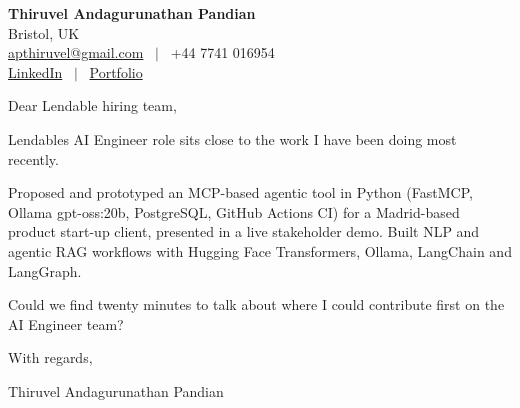 \documentclass[11pt,a4paper]{article}
\begin{document}
\raggedright
\pagestyle{empty}

\begin{center}
    {\LARGE \color{linkblue} \textbf{Thiruvel Andagurunathan Pandian}}\\[0.2cm]
    Bristol, UK \\
    \href{mailto:apthiruvel@gmail.com}{apthiruvel@gmail.com} \ $|$ \ +44 7741 016954 \\
\href{https://www.linkedin.com/in/thiruvel-a-p/}{LinkedIn} \ $|$ \ \href{https://thiruvel-ap.github.io/PersonalPortfolio/}{Portfolio}
\end{center}

\vspace{0.4cm}

\noindent
Dear Lendable hiring team,

Lendable\textquotesingle{}s AI Engineer role sits close to the work I have been doing most recently.

Proposed and prototyped an MCP-based agentic tool in Python (FastMCP, Ollama gpt-oss:20b, PostgreSQL, GitHub Actions CI) for a Madrid-based product start-up client, presented in a live stakeholder demo. Built NLP and agentic RAG workflows with Hugging Face Transformers, Ollama, LangChain and LangGraph.

Could we find twenty minutes to talk about where I could contribute first on the AI Engineer team?

\vspace{0.5cm}

With regards,

Thiruvel Andagurunathan Pandian
\end{document}
